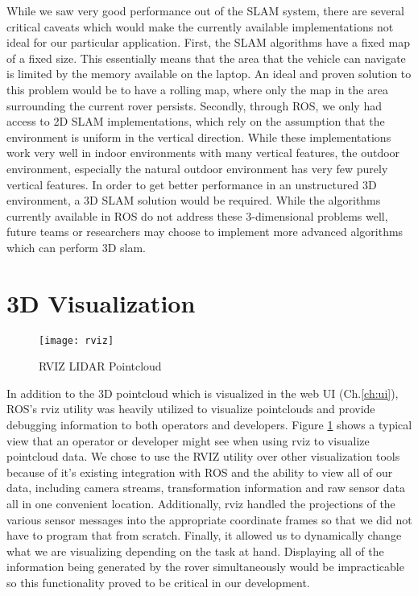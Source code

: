 While we saw very good performance out of the SLAM system, there are several critical caveats which would make the currently available implementations not ideal for our particular application. First, the SLAM algorithms have a fixed map of a fixed size. This essentially means that the area that the vehicle can navigate is limited by the memory available on the laptop. An ideal and proven solution to this problem would be to have a rolling map, where only the map in the area surrounding the current rover persists. Secondly, through ROS, we only had access to 2D SLAM implementations, which rely on the assumption that the environment is uniform in the vertical direction. While these implementations work very well in indoor environments with many vertical features, the outdoor environment, especially the natural outdoor environment has very few purely vertical features. In order to get better performance in an unstructured 3D environment, a 3D SLAM solution would be required. While the algorithms currently available in ROS do not address these 3-dimensional problems well, future teams or researchers may choose to implement more advanced algorithms which can perform 3D slam.

\section{3D Visualization}

\begin{figure}[H]
	\centerline{\texttt{[image: rviz]}}
	\caption[]{RVIZ LIDAR Pointcloud}
	\label{fig:rviz}
\end{figure}

In addition to the 3D pointcloud which is visualized in the web UI (Ch.\ref{ch:ui}), ROS's rviz utility was heavily utilized to visualize pointclouds and provide debugging information to both operators and developers. Figure \ref{fig:rviz} shows a typical view that an operator or developer might see when using rviz to visualize pointcloud data. We chose to use the RVIZ utility over other visualization tools because of it's existing integration with ROS and the ability to view all of our data, including camera streams, transformation information and raw sensor data all in one convenient location. Additionally, rviz handled the projections of the various sensor messages into the appropriate coordinate frames so that we did not have to program that from scratch. Finally, it allowed us to dynamically change what we are visualizing depending on the task at hand. Displaying all of the information being generated by the rover simultaneously would be impracticable so this functionality proved to be critical in our development. 

